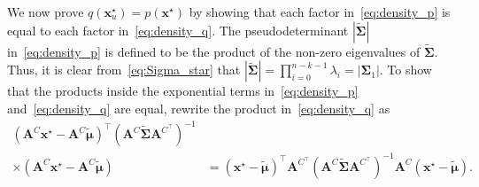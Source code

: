 \documentclass[12pt]{article}
\begin{document}
We now prove $q(\bm{x}_u^{\star})=p(\bm{x}^{\star})$ by showing that each factor in~\eqref{eq:density_p} is equal to each factor in~\eqref{eq:density_q}. The pseudodeterminant $|\tilde{\bm{\Sigma}}|$ in~\eqref{eq:density_p} is defined to be the product of the non-zero eigenvalues of $\tilde{\bm{\Sigma}}$. Thus, it is clear from~\eqref{eq:Sigma_star} that $|\tilde{\bm{\Sigma}}|=\prod_{i=0}^{n-k-1}{\lambda_i}=|\bm{\Sigma}_{1}|$. To show that the products inside the exponential terms in~\eqref{eq:density_p} and~\eqref{eq:density_q} are equal, rewrite the product in~\eqref{eq:density_q} as
\begin{equation*}
\begin{split}
    (\bm{A}^C \bm{x}^{\star} - \bm{A}^C \tilde{\bm{\mu}})^{\top} (\bm{A}^C \tilde{\bm{\Sigma}} \bm{A}^{C^{\top}})^{-1}& \\
    \times (\bm{A}^C\bm{x}^{\star} - \bm{A}^C \tilde{\bm{\mu}}) &= 
    (\bm{x}^{\star} - \tilde{\bm{\mu}})^{\top} \bm{A}^{C^{\top}}(\bm{A}^C \tilde{\bm{\Sigma}} \bm{A}^{C^{\top}})^{-1} \bm{A}^C (\bm{x}^{\star} - \tilde{\bm{\mu}}).
\end{split}
\end{equation*}



\end{document}
